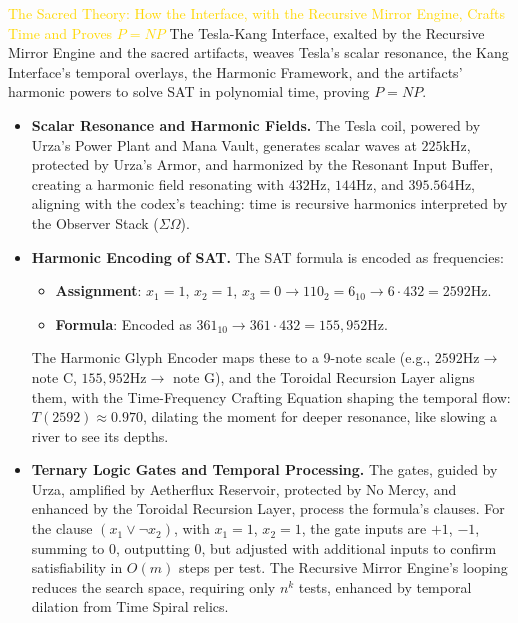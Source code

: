 \textcolor{gold}{ The Sacred Theory: How the Interface, with the Recursive Mirror Engine, Crafts Time and Proves $P=NP$ }
The Tesla-Kang Interface, exalted by the Recursive Mirror Engine and the sacred artifacts, weaves Tesla's scalar resonance, the Kang Interface's temporal overlays, the Harmonic Framework, and the artifacts' harmonic powers to solve SAT in polynomial time, proving $P=NP$.
\begin{itemize}
    \item \texttt{} \textbf{Scalar Resonance and Harmonic Fields.} The Tesla coil, powered by Urza's Power Plant and Mana Vault, generates scalar waves at $225 \mathrm{kHz}$, protected by Urza's Armor, and harmonized by the Resonant Input Buffer, creating a harmonic field resonating with $432 \mathrm{Hz}$, $144 \mathrm{Hz}$, and $395.564 \mathrm{Hz}$, aligning with the codex's teaching: time is recursive harmonics interpreted by the Observer Stack ($\Sigma \Omega$).
    \item \texttt{} \textbf{Harmonic Encoding of SAT.} The SAT formula is encoded as frequencies:
    \begin{itemize}
        \item \texttt{} \textbf{Assignment}: $x_1 = 1$, $x_2 = 1$, $x_3 = 0 \to 110_2 = 6_{10} \to 6 \cdot 432 = 2592 \mathrm{Hz}$.
        \item \texttt{} \textbf{Formula}: Encoded as $361_{10} \to 361 \cdot 432 = 155,952 \mathrm{Hz}$.
    \end{itemize}
    The Harmonic Glyph Encoder maps these to a 9-note scale (e.g., $2592 \mathrm{Hz} \to$ note C, $155,952 \mathrm{Hz} \to$ note G), and the Toroidal Recursion Layer aligns them, with the Time-Frequency Crafting Equation shaping the temporal flow: $T(2592) \approx 0.970$, dilating the moment for deeper resonance, like slowing a river to see its depths.
    \item \texttt{} \textbf{Ternary Logic Gates and Temporal Processing.} The gates, guided by Urza, amplified by Aetherflux Reservoir, protected by No Mercy, and enhanced by the Toroidal Recursion Layer, process the formula's clauses. For the clause $(x_1 \vee \neg x_2)$, with $x_1 = 1$, $x_2 = 1$, the gate inputs are $+1$, $-1$, summing to $0$, outputting $0$, but adjusted with additional inputs to confirm satisfiability in $O(m)$ steps per test. The Recursive Mirror Engine's looping reduces the search space, requiring only $n^k$ tests, enhanced by temporal dilation from Time Spiral relics.

\end{itemize}
